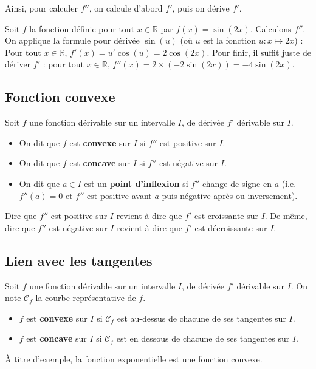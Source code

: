 	Ainsi, pour calculer $f''$, on calcule d'abord $f'$, puis on dérive $f'$.

	\begin{tip}[Exemple]
		Soit $f$ la fonction définie pour tout $x \in \mathbb{R}$ par $f(x) = \sin(2x)$. Calculons $f''$.
		\newpar
		On applique la formule pour dérivée $\sin(u)$ (où $u$ est la fonction $u : x \mapsto 2x$) :
		\newpar
		Pour tout $x \in \mathbb{R}$, $f'(x) = u' \cos(u) = 2 \cos(2x)$.
		\newpar
		Pour finir, il suffit juste de dériver $f'$ : pour tout $x \in \mathbb{R}$, $f''(x) = 2 \times (-2 \sin(2x)) = -4 \sin(2x)$.
	\end{tip}

	\subsection{Fonction convexe}

	\begin{formula}[Définition]
		Soit $f$ une fonction dérivable sur un intervalle $I$, de dérivée $f'$ dérivable sur $I$.
		\begin{itemize}
			\item On dit que $f$ est \textbf{convexe} sur $I$ si $f''$ est positive sur $I$.
			\item On dit que $f$ est \textbf{concave} sur $I$ si $f''$ est négative sur $I$.
			\item On dit que $a \in I$ est un \textbf{point d'inflexion} si $f''$ change de signe en $a$ (i.e. $f''(a) = 0$ et $f''$ est positive avant $a$ puis négative après ou inversement).
		\end{itemize}
	\end{formula}

	\begin{tip}
		Dire que $f''$ est positive sur $I$ revient à dire que $f'$ est croissante sur $I$. De même, dire que $f''$ est négative sur $I$ revient à dire que $f'$ est décroissante sur $I$.
	\end{tip}

	\subsection{Lien avec les tangentes}

	\begin{formula}
		Soit $f$ une fonction dérivable sur un intervalle $I$, de dérivée $f'$ dérivable sur $I$. On note $\mathcal{C}_f$ la courbe représentative de $f$.
		\begin{itemize}
			\item $f$ est \textbf{convexe} sur $I$ si $\mathcal{C}_f$ est au-dessus de chacune de ses tangentes sur $I$.
			\item $f$ est \textbf{concave} sur $I$ si $\mathcal{C}_f$ est en dessous de chacune de ses tangentes sur $I$.
		\end{itemize}
	\end{formula}


	\begin{tip}[Exemple]
		À titre d'exemple, la fonction exponentielle est une fonction convexe.
	\end{tip}

